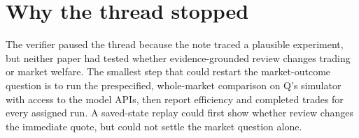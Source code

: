 \documentclass{article}
\begin{document}
\section{Why the thread stopped}

The verifier paused the thread because the note traced a plausible experiment, but neither paper had
tested whether evidence-grounded review changes trading or market welfare. The smallest step that
could restart the market-outcome question is to run the prespecified, whole-market comparison on Q's
simulator with access to the model APIs, then report efficiency and completed trades for every
assigned run. A saved-state replay could first show whether review changes the immediate quote, but
could not settle the market question alone.



\end{document}
